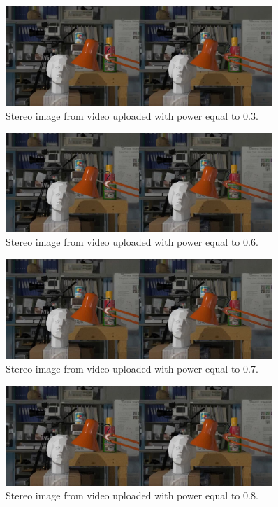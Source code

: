 \begin{figure}[h!]
\centering
\includegraphics[width=0.9\textwidth]{./img/yt_03_gt.jpg}
\caption{\small{Stereo image from video uploaded with power equal to 0.3. }}
\label{fig:03yt}
\end{figure}
\begin{figure}[h!]
\centering
\includegraphics[width=0.9\textwidth]{./img/yt_06_gt.jpg}
\caption{\small{Stereo image from video uploaded with power equal to 0.6. }}
\label{fig:06yt}
\end{figure}
\begin{figure}[h!]
\centering
\includegraphics[width=0.9\textwidth]{./img/yt_07_gt.jpg}
\caption{\small{Stereo image from video uploaded with power equal to 0.7. }}
\label{fig:07yt}
\end{figure}
\begin{figure}[h!]
\centering
\includegraphics[width=0.9\textwidth]{./img/yt_08_gt.jpg}
\caption{\small{Stereo image from video uploaded with power equal to 0.8. }}
\label{fig:08yt}
\end{figure}
\clearpage

